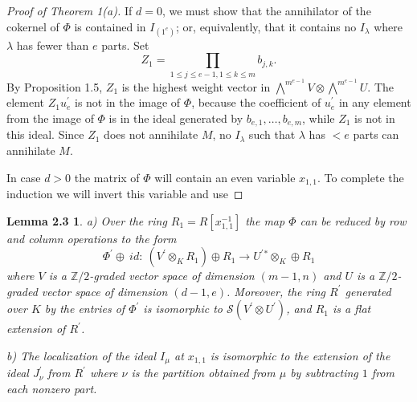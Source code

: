 \documentclass{tran-l}
\theoremstyle{plain}
\newtheorem*{theorem13}{Lemma 2.3}
\theoremstyle{remark}
\theoremstyle{definition}
\newcommand{\myS}{{\mathcal S}}
\newcommand{\ZZ}{\mathbb {Z}}
\begin{document}
\begin{proof}[Proof of Theorem \textup{1(a)}]
If $d=0$, we must show that the annihilator
of the cokernel of $\Phi $ is contained in
$I_{(1^{e} )}$; or, equivalently, that it contains
no $I_{\lambda }$ where $\lambda $ has fewer than $e$ parts.
Set
\begin{equation*}Z_{1}=\prod _{1\le j\le e-1 ,1\le k\le m} b_{j,k}.
\end{equation*}
By Proposition 1.5,
$Z_{1}$ is the highest weight vector in
$\bigwedge ^{m^{e-1}}V\otimes \bigwedge ^{m^{e-1}}U$.
The element
$Z_{1} u_{e}^{\prime }$ is not
in the image of $\Phi $,
because the coefficient of
$u_{e}^{\prime }$ in any element from the image of $\Phi $ is in the
ideal generated by $b_{e,1},\ldots ,b_{e,m}$,
while $Z_{1}$ is not in this ideal.
Since $Z_{1}$ does not annihilate $M$, no $I_{\lambda }$
such that $\lambda $ has
$<e$ parts can annihilate $M$.

In case $d>0$ the matrix of $\Phi $ will contain an
even variable $x_{1,1}$. To complete the induction we will
invert this variable and use
\end{proof}
\begin{theorem13} \textup{a)}
 Over the ring $R_{1} =R[x_{1,1}^{-1}]$ the map $\Phi $ can be
reduced by row and column operations to the form
\begin{equation*}\Phi ^{\prime }\oplus \ id :\
(V^{\prime }\otimes _{K} R_{1}) \oplus R_{1} \rightarrow U^{\prime }{}^{*}\otimes _{K} \oplus R_{1}
\end{equation*}
where $V$ is a $\ZZ /2$-graded vector space of dimension $(m-1,n)$ and
$U$ is a $\ZZ /2$-graded vector space
of dimension $(d-1,e)$. Moreover, the ring $R^{\prime }$ generated over $K$ by
the entries of $\Phi ^{\prime }$ is
isomorphic to $\myS (V^{\prime }\otimes U^{\prime })$, and $R_{1}$ is a flat
extension of $R^{\prime }$.

\textup{b)} The localization of the ideal $I_{\mu }$ at $x_{1,1}$ is isomorphic
to the extension of the ideal
$J^{\prime }_{\nu }$ from $R^{\prime }$ where $\nu $ is the
partition obtained from $\mu $ by subtracting $1$ from each nonzero part.
\end{theorem13}
\end{document}
